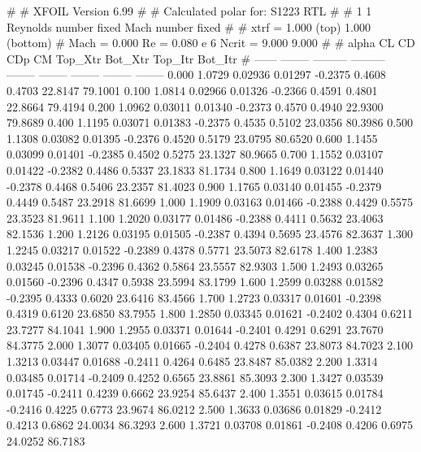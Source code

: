 #  
#       XFOIL         Version 6.99
#  
# Calculated polar for: S1223 RTL                                       
#  
# 1 1 Reynolds number fixed          Mach number fixed         
#  
# xtrf =   1.000 (top)        1.000 (bottom)  
# Mach =   0.000     Re =     0.080 e 6     Ncrit =   9.000  9.000
#  
#   alpha    CL        CD       CDp       CM     Top_Xtr  Bot_Xtr  Top_Itr  Bot_Itr
#  ------ -------- --------- --------- -------- -------- -------- -------- --------
   0.000   1.0729   0.02936   0.01297  -0.2375   0.4608   0.4703  22.8147  79.1001
   0.100   1.0814   0.02966   0.01326  -0.2366   0.4591   0.4801  22.8664  79.4194
   0.200   1.0962   0.03011   0.01340  -0.2373   0.4570   0.4940  22.9300  79.8689
   0.400   1.1195   0.03071   0.01383  -0.2375   0.4535   0.5102  23.0356  80.3986
   0.500   1.1308   0.03082   0.01395  -0.2376   0.4520   0.5179  23.0795  80.6520
   0.600   1.1455   0.03099   0.01401  -0.2385   0.4502   0.5275  23.1327  80.9665
   0.700   1.1552   0.03107   0.01422  -0.2382   0.4486   0.5337  23.1833  81.1734
   0.800   1.1649   0.03122   0.01440  -0.2378   0.4468   0.5406  23.2357  81.4023
   0.900   1.1765   0.03140   0.01455  -0.2379   0.4449   0.5487  23.2918  81.6699
   1.000   1.1909   0.03163   0.01466  -0.2388   0.4429   0.5575  23.3523  81.9611
   1.100   1.2020   0.03177   0.01486  -0.2388   0.4411   0.5632  23.4063  82.1536
   1.200   1.2126   0.03195   0.01505  -0.2387   0.4394   0.5695  23.4576  82.3637
   1.300   1.2245   0.03217   0.01522  -0.2389   0.4378   0.5771  23.5073  82.6178
   1.400   1.2383   0.03245   0.01538  -0.2396   0.4362   0.5864  23.5557  82.9303
   1.500   1.2493   0.03265   0.01560  -0.2396   0.4347   0.5938  23.5994  83.1799
   1.600   1.2599   0.03288   0.01582  -0.2395   0.4333   0.6020  23.6416  83.4566
   1.700   1.2723   0.03317   0.01601  -0.2398   0.4319   0.6120  23.6850  83.7955
   1.800   1.2850   0.03345   0.01621  -0.2402   0.4304   0.6211  23.7277  84.1041
   1.900   1.2955   0.03371   0.01644  -0.2401   0.4291   0.6291  23.7670  84.3775
   2.000   1.3077   0.03405   0.01665  -0.2404   0.4278   0.6387  23.8073  84.7023
   2.100   1.3213   0.03447   0.01688  -0.2411   0.4264   0.6485  23.8487  85.0382
   2.200   1.3314   0.03485   0.01714  -0.2409   0.4252   0.6565  23.8861  85.3093
   2.300   1.3427   0.03539   0.01745  -0.2411   0.4239   0.6662  23.9254  85.6437
   2.400   1.3551   0.03615   0.01784  -0.2416   0.4225   0.6773  23.9674  86.0212
   2.500   1.3633   0.03686   0.01829  -0.2412   0.4213   0.6862  24.0034  86.3293
   2.600   1.3721   0.03708   0.01861  -0.2408   0.4206   0.6975  24.0252  86.7183
